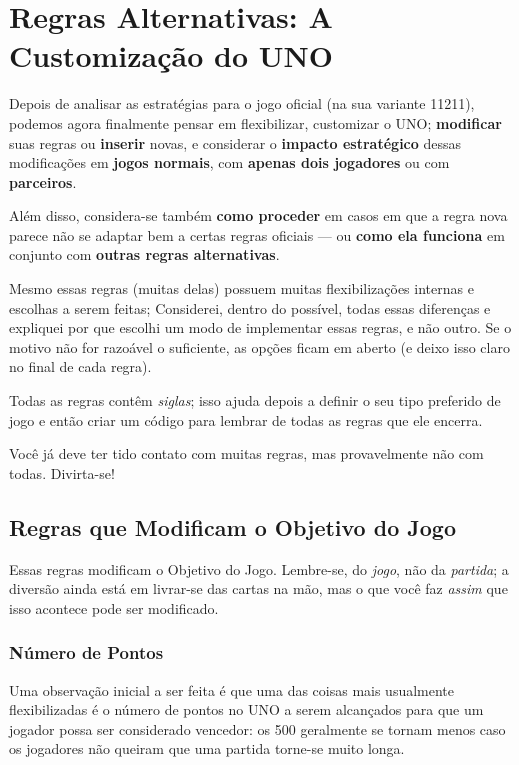 \section{Regras Alternativas: A Customização do UNO}

Depois de analisar as estratégias para o jogo oficial (na sua variante 11211), podemos agora finalmente pensar em flexibilizar, customizar o UNO; \textbf{modificar} suas regras ou \textbf{inserir} novas, e considerar o \textbf{impacto estratégico} dessas modificações em \textbf{jogos normais}, com \textbf{apenas dois jogadores} ou com \textbf{parceiros}.

Além disso, considera-se também \textbf{como proceder} em casos em que a regra nova parece não se adaptar bem a certas regras oficiais --- ou \textbf{como ela funciona} em conjunto com \textbf{outras regras alternativas}.

Mesmo essas regras (muitas delas) possuem muitas flexibilizações internas e escolhas a serem feitas; Considerei, dentro do possível, todas essas diferenças e expliquei por que escolhi um modo de implementar essas regras, e não outro. Se o motivo não for razoável o suficiente, as opções ficam em aberto (e deixo isso claro no final de cada regra).

Todas as regras contêm \textit{siglas}; isso ajuda depois a definir o seu tipo preferido de jogo e então criar um código para lembrar de todas as regras que ele encerra.

Você já deve ter tido contato com muitas regras, mas provavelmente não com todas. Divirta-se!

\subsection{Regras que Modificam o Objetivo do Jogo}

Essas regras modificam o Objetivo do Jogo. Lembre-se, do \textit{jogo}, não da \textit{partida}; a diversão ainda está em livrar-se das cartas na mão, mas o que você faz \emph{assim} que isso acontece pode ser modificado.

\subsubsection{Número de Pontos}

Uma observação inicial a ser feita é que uma das coisas mais usualmente flexibilizadas é o número de pontos no UNO a serem alcançados para que um jogador possa ser considerado vencedor: os 500 geralmente se tornam menos caso os jogadores não queiram que uma partida torne-se muito longa.

